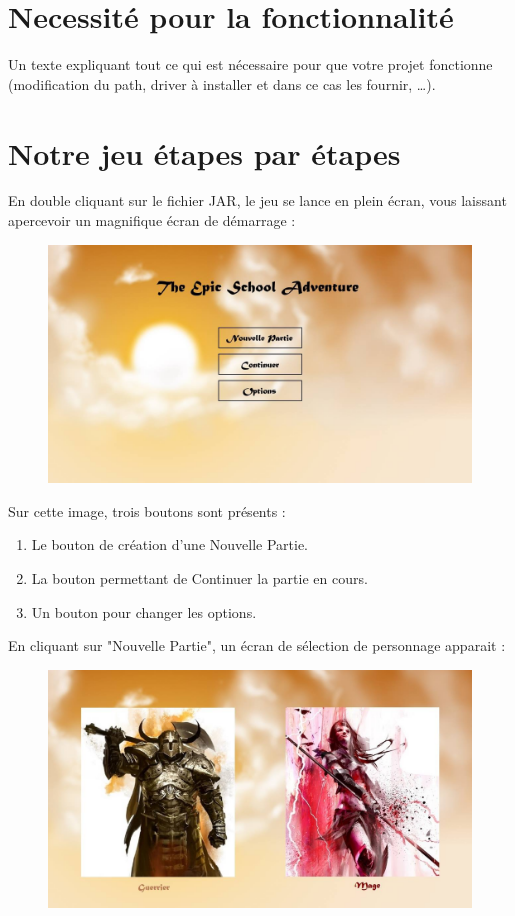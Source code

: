 \documentclass[a4paper,titlepage]{article}
\begin{document}
	\section{Necessité pour la fonctionnalité}
	Un texte expliquant tout ce qui est nécessaire pour que votre projet fonctionne (modification du path, driver à installer et dans ce cas les fournir, …).
	\clearpage
	
	\section{Notre jeu étapes par étapes}
	En double cliquant sur le fichier JAR, le jeu se lance en plein écran, vous laissant apercevoir un magnifique écran de démarrage :
	\begin{figure}[h!]
		\includegraphics[scale=0.30]{EcranDebut.jpg}
	\end{figure}
	
	Sur cette image, trois boutons sont présents : 
	\begin{enumerate}
		\item Le bouton de création d'une Nouvelle Partie.
		\item La bouton permettant de Continuer la partie en cours.
		\item Un bouton pour changer les options.
	\end{enumerate}
	
	En cliquant sur "Nouvelle Partie", un écran de sélection de personnage apparait :
	\begin{figure}[h!]
		\includegraphics[scale=0.30]{EcranCreationPersonnage.jpg}
	\end{figure}
	
\end{document}
